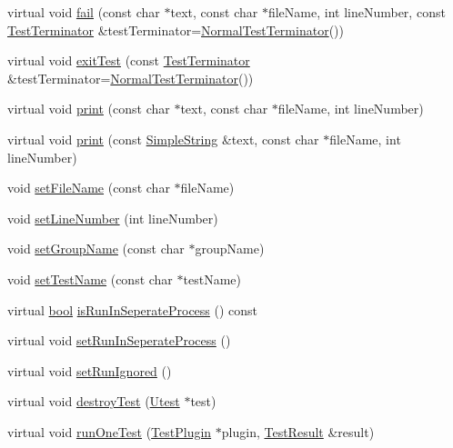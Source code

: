 \begin{DoxyCompactItemize}
\item 
virtual void \hyperlink{class_utest_shell_a551151a34264d19c3954dab0948ea186}{fail} (const char $\ast$text, const char $\ast$file\+Name, int line\+Number, const \hyperlink{class_test_terminator}{Test\+Terminator} \&test\+Terminator=\hyperlink{class_normal_test_terminator}{Normal\+Test\+Terminator}())
\item 
virtual void \hyperlink{class_utest_shell_a458328ad1ce8e11040bc388f27d26975}{exit\+Test} (const \hyperlink{class_test_terminator}{Test\+Terminator} \&test\+Terminator=\hyperlink{class_normal_test_terminator}{Normal\+Test\+Terminator}())
\item 
virtual void \hyperlink{class_utest_shell_a9e7f161718569c365ee9bc9b5c3bfd28}{print} (const char $\ast$text, const char $\ast$file\+Name, int line\+Number)
\item 
virtual void \hyperlink{class_utest_shell_a864d937ec0d0bc780e4495a95ce79bb5}{print} (const \hyperlink{class_simple_string}{Simple\+String} \&text, const char $\ast$file\+Name, int line\+Number)
\item 
void \hyperlink{class_utest_shell_a276904542d6a7885b80ea9e494e8bc20}{set\+File\+Name} (const char $\ast$file\+Name)
\item 
void \hyperlink{class_utest_shell_ab16999ec38298569f6eb6933ca0416b3}{set\+Line\+Number} (int line\+Number)
\item 
void \hyperlink{class_utest_shell_a1bd15ccf10b94d820271b74ff6e9c534}{set\+Group\+Name} (const char $\ast$group\+Name)
\item 
void \hyperlink{class_utest_shell_adcba7e1f936ea12d57c7ef2949c9fd08}{set\+Test\+Name} (const char $\ast$test\+Name)
\item 
virtual \hyperlink{avb__gptp_8h_af6a258d8f3ee5206d682d799316314b1}{bool} \hyperlink{class_utest_shell_a24f44ff874b460e5e055050af80fb302}{is\+Run\+In\+Seperate\+Process} () const 
\item 
virtual void \hyperlink{class_utest_shell_a2bcc7ce67efa05a04dbc8ab8760d1854}{set\+Run\+In\+Seperate\+Process} ()
\item 
virtual void \hyperlink{class_utest_shell_a861854e4e01f41f5bcc490a0dc0621b0}{set\+Run\+Ignored} ()
\item 
virtual void \hyperlink{class_utest_shell_a797d022228765f30bd7455a863011797}{destroy\+Test} (\hyperlink{class_utest}{Utest} $\ast$test)
\item 
virtual void \hyperlink{class_utest_shell_a86b5bcccee3889c16117ea5cccee12b5}{run\+One\+Test} (\hyperlink{class_test_plugin}{Test\+Plugin} $\ast$plugin, \hyperlink{class_test_result}{Test\+Result} \&result)

\end{DoxyCompactItemize}
